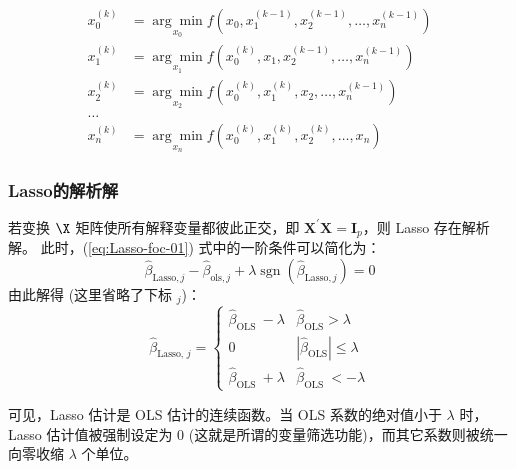 \begin{equation}
\begin{aligned}
x_0^{(k)} &=\underset{x_0}{\arg \min } f\left(x_0, x_1^{(k-1)}, x_2^{(k-1)}, \ldots, x_n^{(k-1)}\right) \\
x_1^{(k)} &=\underset{x_1}{\arg \min } f\left(x_0^{(k)}, x_1, x_2^{(k-1)}, \ldots, x_n^{(k-1)}\right) \\
x_2^{(k)} &=\underset{x_2}{\arg \min } f\left(x_0^{(k)}, x_1^{(k)}, x_2, \ldots, x_n^{(k-1)}\right) \\
\ldots & \\
x_n^{(k)} &=\underset{x_n}{\arg \min } f\left(x_0^{(k)}, x_1^{(k)}, x_2^{(k)}, \ldots, x_n\right)
\end{aligned}
\end{equation}

\subsubsection{Lasso的解析解}
若变换 $\X$ 矩阵使所有解释变量都彼此正交，即 $\boldsymbol{X}^{\prime} \boldsymbol{X}=\boldsymbol{I}_{p}$，则 Lasso 存在解析解。
此时，(\ref{eq:Lasso-foc-01}) 式中的一阶条件可以简化为：
$$
  \widehat{\beta}_{\mathrm{Lasso}, j}-\widehat{\beta}_{\mathrm{ols}, j} 
  +\lambda \operatorname{sgn}\left(\widehat{\beta}_{\mathrm{Lasso}, j}\right)=0
$$
由此解得 (这里省略了下标 $_j$)：
\begin{equation}\label{eq:Lasso-foc-03}
\widehat{\beta}_{\text {Lasso, } j}=\left\{
\begin{array}{cc}
\widehat{\beta}_{\text {OLS }}-\lambda & \widehat{\beta}_{\text {OLS}}>\lambda \\
0 & |\widehat{\beta}_{\text {OLS}}| \leq \lambda \\ 
\widehat{\beta}_{\text {OLS }}+\lambda & \widehat{\beta}_{\text {OLS }}<-\lambda
\end{array}\right.	
\end{equation}

可见，Lasso 估计是 OLS 估计的连续函数。当 OLS 系数的绝对值小于 $\lambda$ 时，Lasso 估计值被强制设定为 0 (这就是所谓的变量筛选功能)，而其它系数则被统一向零收缩 $\lambda$ 个单位。


